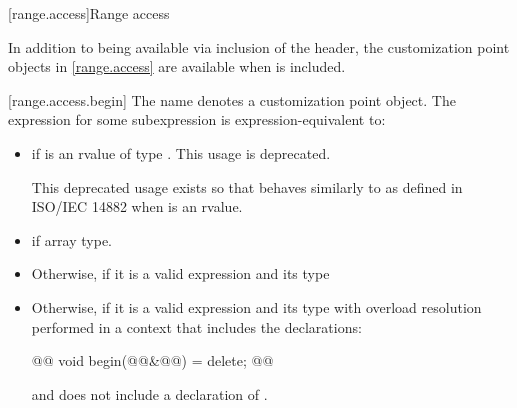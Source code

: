 {[range.access]{Range access}


\pnum
In addition to being available via inclusion of the
header, the customization point objects in \ref{range.access} are
available when  is included.

[range.access.begin]{}
\pnum
The name  denotes a customization point
 object. The expression
 for some subexpression  is expression-equivalent to:

\begin{itemize}
\item
  {\color{oldclr}
   if  is an rvalue of
  type . This usage is deprecated.
  \begin{note}
  This deprecated usage exists so that
   behaves similarly to 
  as defined in ISO/IEC 14882 when  is an rvalue.
  \end{note}
  } %

\item
   if   array
  type.

\item
  Otherwise,  
  if it is a valid expression and its type  

\item
  Otherwise,  if it is a valid expression and its type    with overload
  resolution performed in a context that includes the declarations:
  \begin{codeblock}
  @@ void begin(@@&@\newtxt{\&}@) = delete;
  @@
  \end{codeblock}
  and does not include a declaration of . 


\end{itemize}}

